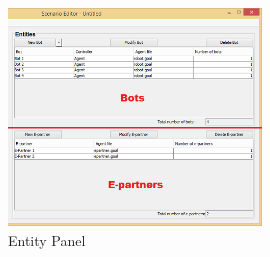 \documentclass[11pt,a4paper]{article}
\begin{document}
\begin{figure}[h]
\begin{center}
\includegraphics[width=0.6\textwidth]{bot.png}
\end{center}
\caption{Entity Panel}\label{fig:EntityPanel}
\end{figure}
\end{document}

